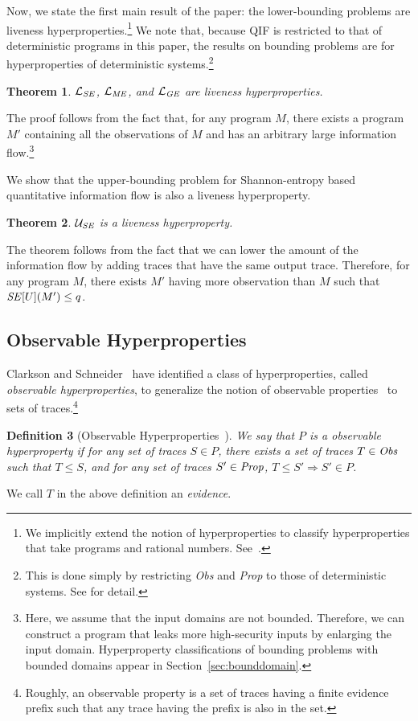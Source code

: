 \documentclass[]{eptcs}
\newtheorem{theorem}{Theorem}[section]
\newtheorem{definition}[theorem]{Definition}
\begin{document}
Now, we state the first main result of the paper: the lower-bounding
problems are liveness hyperproperties.\footnote{We implicitly extend
  the notion of hyperproperties to classify hyperproperties that take
  programs and rational numbers.
  See~\cite{DBLP:conf/esorics/YasuokaT10}.}  We note that, because QIF
is restricted to that of deterministic programs in this paper, the
results on bounding problems are for hyperproperties of deterministic
systems.\footnote{This is done simply by restricting {\it Obs} and
  {\it Prop} to those of deterministic systems.  See
  \cite{DBLP:journals/jcs/ClarksonS10} for detail.}
\begin{theorem}
\label{thm:Llp}
${\mathcal L}_{\it SE}$, ${\mathcal L}_{\it ME}$, and ${\mathcal
  L}_{\it GE}$ are liveness hyperproperties.
\end{theorem}
The proof follows from the fact that, for any program $M$, there
exists a program $M'$ containing all the observations of $M$ and has
an arbitrary large information flow.\footnote{Here, we assume that the
  input domains are not bounded.  Therefore, we can construct a
  program that leaks more high-security inputs by enlarging the input
  domain.  Hyperproperty classifications of bounding problems with
  bounded domains appear in Section~\ref{sec:bounddomain}.}

We show that the upper-bounding problem for Shannon-entropy based
quantitative information flow is also a liveness hyperproperty.
\begin{theorem}
\label{thm:USElp}
${\mathcal U}_{\it SE}$ is a liveness hyperproperty.
\end{theorem}
The theorem follows from the fact that we can lower the amount of the
information flow by adding traces that have the same output trace.
Therefore, for any program $M$, there exists $M'$ having more
observation than $M$ such that ${\it SE}[U](M') \leq q$.

\subsection{Observable Hyperproperties}
Clarkson and Schneider~\cite{DBLP:journals/jcs/ClarksonS10} have
identified a class of hyperproperties, called {\em observable
  hyperproperties}, to generalize the notion of observable
properties~\cite{DBLP:journals/apal/Abramsky91} to sets of
traces.\footnote{Roughly, an observable property is a set of traces
  having a finite evidence prefix such that any trace having the
  prefix is also in the set.}
\begin{definition}[Observable
  Hyperproperties~\cite{DBLP:journals/jcs/ClarksonS10}]
  We say that $P$ is a observable hyperproperty if for any set of
  traces $S \in P$, there exists a set of traces $T\in{\it Obs}$ such
  that $T\le S$, and for any set of traces $S'\in{\it Prop}$, $T\le
  S'\Rightarrow S'\in P$.
\end{definition}
We call $T$ in the above definition an {\em evidence}.
\end{document}
